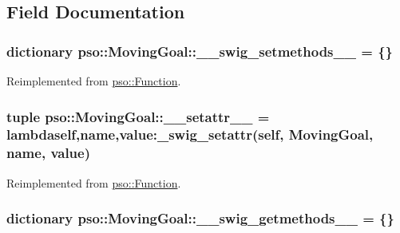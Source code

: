 \subsection{Field Documentation}
\hypertarget{classpso_1_1MovingGoal_ec7da72a4fcf6a13f9f700b4dcf02b34}{
\subsubsection{\setlength{\rightskip}{0pt plus 5cm}dictionary {\bf pso::MovingGoal::\_\-\_\-swig\_\-setmethods\_\-\_\-} = \{\}}}
\label{classpso_1_1MovingGoal_ec7da72a4fcf6a13f9f700b4dcf02b34}




Reimplemented from \hyperlink{classpso_1_1Function_2334bfe507115d58047f67960dde71d3}{pso::Function}.\hypertarget{classpso_1_1MovingGoal_bfa092e032ac4ccf2c8d070ec1e33dab}{
\subsubsection{\setlength{\rightskip}{0pt plus 5cm}tuple {\bf pso::MovingGoal::\_\-\_\-setattr\_\-\_\-} = lambdaself,name,value:\_\-swig\_\-setattr(self, {\bf MovingGoal}, name, value)}}
\label{classpso_1_1MovingGoal_bfa092e032ac4ccf2c8d070ec1e33dab}




Reimplemented from \hyperlink{classpso_1_1Function_cd8775cf6aadc3fdf4e6d82158ef10fb}{pso::Function}.\hypertarget{classpso_1_1MovingGoal_172aea1916c9d8526a126fde97abd8d3}{
\subsubsection{\setlength{\rightskip}{0pt plus 5cm}dictionary {\bf pso::MovingGoal::\_\-\_\-swig\_\-getmethods\_\-\_\-} = \{\}}}
\label{classpso_1_1MovingGoal_172aea1916c9d8526a126fde97abd8d3}




